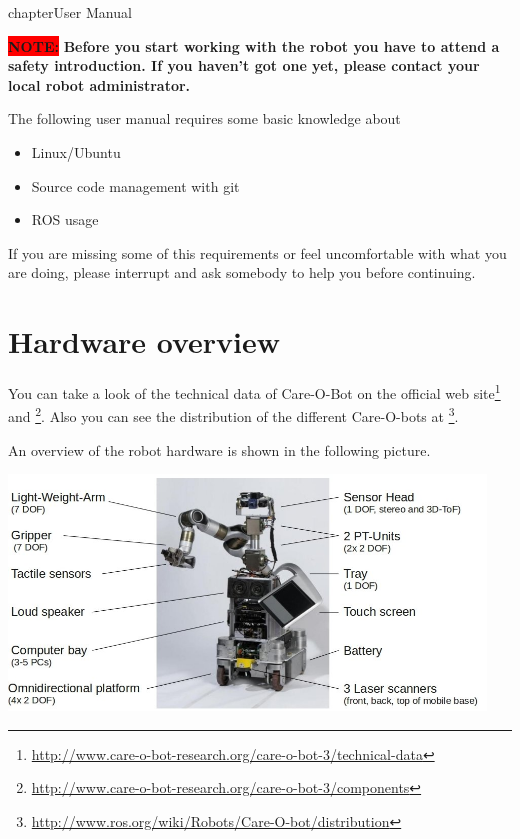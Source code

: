 chapter{User Manual}
\label{chap:user}    

{\colorbox{red}{\textbf{NOTE:}}}\textbf{ Before you start working with the robot you have to attend a safety introduction. If you haven't got one yet, please contact your local robot administrator.}

The following user manual requires some basic knowledge about
\begin{itemize}
\item Linux/Ubuntu
\item Source code management with git
\item ROS usage
\end{itemize}
If you are missing some of this requirements or feel uncomfortable with what you are doing, please interrupt and ask somebody to help you before continuing.

\section{Hardware overview}
You can take a look of the technical data of Care-O-Bot on the official web site\footnote{\url{http://www.care-o-bot-research.org/care-o-bot-3/technical-data}} and \footnote{\url{http://www.care-o-bot-research.org/care-o-bot-3/components}}. Also you can see the distribution of the different Care-O-bots at \footnote{\url{http://www.ros.org/wiki/Robots/Care-O-bot/distribution}}.

An overview of the robot hardware is shown in the following picture.
\begin{center}
 \includegraphics[width=0.95\textwidth]{images/hardware_overview.jpg}
\end{center}

